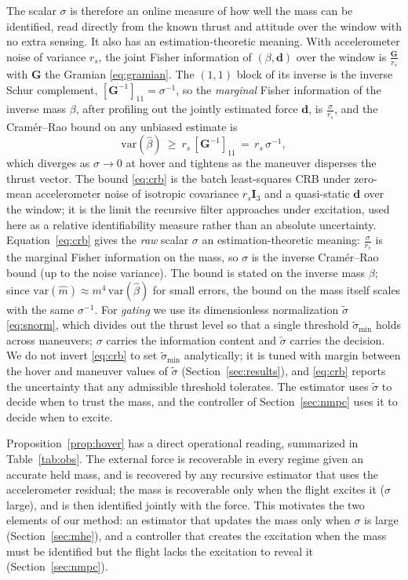 \documentclass[lettersize,journal]{IEEEtran}
\newcommand{\vect}[1]{\bm{#1}}
\newcommand{\mat}[1]{\mathbf{#1}}
\begin{document}
The scalar $\sigma$ is therefore an online measure of how well the mass can be
identified, read directly from the known thrust and attitude over the window with
no extra sensing. It also has an estimation-theoretic meaning. With accelerometer
noise of variance $r_s$, the joint Fisher information of $(\beta,\vect{d})$ over
the window is $\tfrac{\mat{G}}{r_s}$ with $\mat{G}$ the Gramian \eqref{eq:gramian}. The
$(1,1)$ block of its inverse is the inverse Schur complement, $[\mat{G}^{-1}]_{11}=\sigma^{-1}$,
so the \emph{marginal} Fisher information of the inverse mass $\beta$, after
profiling out the jointly estimated force $\vect{d}$, is $\tfrac{\sigma}{r_s}$, and the
Cram\'er--Rao bound on any unbiased estimate is
\begin{equation}
\mathrm{var}(\hat\beta)\ \geq\ r_s\,[\mat{G}^{-1}]_{11}\,=\,r_s\,\sigma^{-1},
\label{eq:crb}
\end{equation}
which diverges as $\sigma\to0$ at hover and tightens as the maneuver disperses
the thrust vector. The bound \eqref{eq:crb} is the batch least-squares CRB under
zero-mean accelerometer noise of isotropic covariance $r_s\mat{I}_3$ and a
quasi-static $\vect{d}$ over the window; it is the limit the recursive filter
approaches under excitation, used here as a relative identifiability measure rather
than an absolute uncertainty. Equation~\eqref{eq:crb} gives the \emph{raw} scalar $\sigma$ an
estimation-theoretic meaning: $\tfrac{\sigma}{r_s}$ is the marginal Fisher information on the
mass, so $\sigma$ is the inverse Cram\'er--Rao bound (up to the noise variance).
The bound is stated on the inverse mass $\beta$; since
$\mathrm{var}(\hat m)\approx m^4\,\mathrm{var}(\hat\beta)$ for small errors, the
bound on the mass itself scales with the same $\sigma^{-1}$.
For \emph{gating} we use its dimensionless normalization $\tilde\sigma$
\eqref{eq:snorm}, which divides out the thrust level so that a single threshold
$\tilde\sigma_{\min}$ holds across maneuvers; $\sigma$ carries the information
content and $\tilde\sigma$ carries the decision. We do not invert \eqref{eq:crb} to
set $\tilde\sigma_{\min}$ analytically; it is tuned with margin between the hover and
maneuver values of $\tilde\sigma$ (Section~\ref{sec:results}), and \eqref{eq:crb}
reports the uncertainty that any admissible threshold tolerates. The estimator uses
$\tilde\sigma$ to decide when to trust the mass, and the controller of
Section~\ref{sec:nmpc} uses it to decide when to excite.

Proposition~\ref{prop:hover} has a direct operational reading, summarized in
Table~\ref{tab:obs}. The external force is recoverable in every regime given an
accurate held mass, and is
recovered by any recursive estimator that uses the accelerometer residual; the
mass is recoverable only when the
flight excites it ($\sigma$ large), and is then identified jointly with the
force. This motivates the two elements of our method: an estimator that updates
the mass only when $\sigma$ is large (Section~\ref{sec:mhe}), and a controller
that creates the excitation when the mass must be identified but the flight
lacks the excitation to reveal it (Section~\ref{sec:nmpc}).
\end{document}
